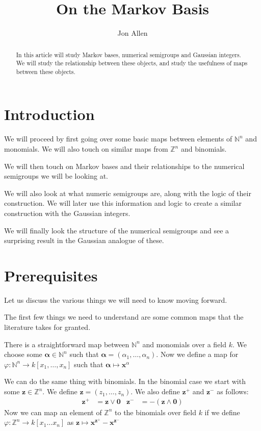 \documentclass[11pt]{amsart}
\theoremstyle{plain}
\theoremstyle{definition}
\begin{document}
\title{On the Markov Basis}
\author{Jon Allen}
\begin{abstract}
In this article will study Markov bases, numerical semigroups and Gaussian
integers. We will study the relationship between these objects, and study  the
usefulness of maps between these objects.
\end{abstract}
\maketitle
\section{Introduction}
We will proceed by first going over some basic maps between elements of
$\mathbb{N}^n$ and monomials. We will also touch on similar maps from
$\mathbb{Z}^n$ and binomials.

We will then touch on Markov bases and their relationships to the numerical
semigroups we will be looking at.

We will also look at what numeric semigroups are, along with the logic of their
construction. We will later use this information and logic to create a similar
construction with the Gaussian integers.

We will finally look the structure of the numerical semigroups and see a
surprising result in the Gaussian analogue of these.
\section{Prerequisites}
Let us discuss the various things we will need to know moving forward.

The first few things we need to understand are some common maps that the
literature takes for granted.

There is a straightforward map between $\mathbb{N}^n$ and monomials over a field
$k$. We choose some $\mathbf{\alpha}\in \mathbb{N}^n$ such that $\mathbf{\alpha}
=(\alpha_1,\dots,\alpha_n)$. Now we define a map for $\varphi:\mathbb{N}^n\to
k[x_1,\dots,x_n]$ such that $\mathbf{\alpha}\mapsto \mathbf{x}^\alpha$

We can do the same thing with binomials.
In the binomial case we start with some $\mathbf{z}\in \mathbb{Z}^n$.
We define $\mathbf{z}=(z_1,\dots,z_n)$.
We also define $\mathbf{z}^+$ and $\mathbf{z}^-$ as follows:
\begin{align*}
  \mathbf{z}^+&=\mathbf{z}\vee\mathbf{0}&
  \mathbf{z}^-&=-(\mathbf{z}\wedge\mathbf{0})
\end{align*}
Now we can map an element of $\mathbb{Z}^n$ to the binomials over field $k$ if we define $\varphi:\mathbb{Z}^n\to k[x_1\dots x_n]$ as $\mathbf{z}\mapsto \mathbf{x}^{\mathbf{z}^+}-\mathbf{x}^{\mathbf{z}^-}$
\end{document}
